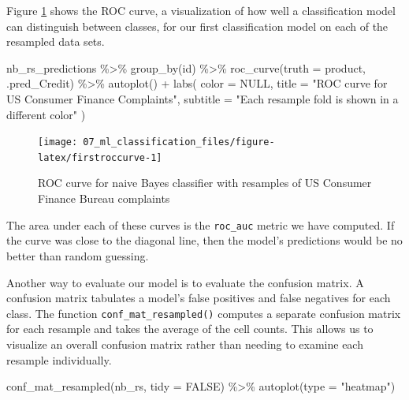 \documentclass[
]{krantz}
\makeatletter
\newenvironment{Shaded}{\begin{snugshade}}{\end{snugshade}}
\newcommand{\AttributeTok}[1]{\textcolor[rgb]{0.77,0.63,0.00}{#1}}
\newcommand{\ConstantTok}[1]{\textcolor[rgb]{0.00,0.00,0.00}{#1}}
\newcommand{\FunctionTok}[1]{\textcolor[rgb]{0.00,0.00,0.00}{#1}}
\newcommand{\NormalTok}[1]{#1}
\newcommand{\SpecialCharTok}[1]{\textcolor[rgb]{0.00,0.00,0.00}{#1}}
\newcommand{\StringTok}[1]{\textcolor[rgb]{0.31,0.60,0.02}{#1}}
\newenvironment{kframe}{%
\medskip{}
\setlength{\fboxsep}{.8em}
 \def\at@end@of@kframe{}%
 \ifinner\ifhmode%
  \def\at@end@of@kframe{\end{minipage}}%
  \begin{minipage}{\columnwidth}%
 \fi\fi%
 \def\FrameCommand##1{\hskip\@totalleftmargin \hskip-\fboxsep
 \colorbox{shadecolor}{##1}\hskip-\fboxsep
     \hskip-\linewidth \hskip-\@totalleftmargin \hskip\columnwidth}%
 \MakeFramed {\advance\hsize-\width
   \@totalleftmargin\z@ \linewidth\hsize
   \@setminipage}}%
 {\par\unskip\endMakeFramed%
 \at@end@of@kframe}
\renewenvironment{Shaded}{\begin{kframe}}{\end{kframe}}
\makeatother
\begin{document}
Figure \ref{fig:firstroccurve} shows the ROC curve, a visualization of how well a classification model can distinguish between classes, for our first classification model on each of the resampled data sets.

\begin{Shaded}
\begin{Highlighting}[]
\NormalTok{nb\_rs\_predictions }\SpecialCharTok{\%\textgreater{}\%}
  \FunctionTok{group\_by}\NormalTok{(id) }\SpecialCharTok{\%\textgreater{}\%}
  \FunctionTok{roc\_curve}\NormalTok{(}\AttributeTok{truth =}\NormalTok{ product, .pred\_Credit) }\SpecialCharTok{\%\textgreater{}\%}
  \FunctionTok{autoplot}\NormalTok{() }\SpecialCharTok{+}
  \FunctionTok{labs}\NormalTok{(}
    \AttributeTok{color =} \ConstantTok{NULL}\NormalTok{,}
    \AttributeTok{title =} \StringTok{"ROC curve for US Consumer Finance Complaints"}\NormalTok{,}
    \AttributeTok{subtitle =} \StringTok{"Each resample fold is shown in a different color"}
\NormalTok{  )}
\end{Highlighting}
\end{Shaded}

\begin{figure}

{\centering \texttt{[image: 07\_ml\_classification\_files/figure-latex/firstroccurve-1]} 

}

\caption{ROC curve for naive Bayes classifier with resamples of US Consumer Finance Bureau complaints}\label{fig:firstroccurve}
\end{figure}

The area under each of these curves is the \texttt{roc\_auc} metric we have computed. If the curve was close to the diagonal line, then the model's predictions would be no better than random guessing.

Another way to evaluate our model is to evaluate the confusion matrix. A confusion matrix tabulates a model's false positives and false negatives for each class.
The function \texttt{conf\_mat\_resampled()} computes a separate confusion matrix for each resample and takes the average of the cell counts. This allows us to visualize an overall confusion matrix rather than needing to examine each resample individually.

\begin{Shaded}
\begin{Highlighting}[]
\FunctionTok{conf\_mat\_resampled}\NormalTok{(nb\_rs, }\AttributeTok{tidy =} \ConstantTok{FALSE}\NormalTok{) }\SpecialCharTok{\%\textgreater{}\%}
  \FunctionTok{autoplot}\NormalTok{(}\AttributeTok{type =} \StringTok{"heatmap"}\NormalTok{)}
\end{Highlighting}
\end{Shaded}
\end{document}
